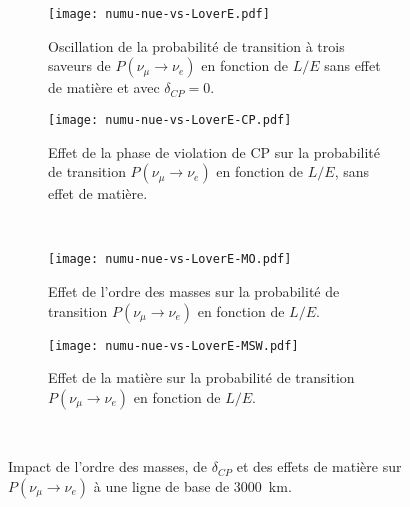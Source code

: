       \begin{figure}[!htb]
        \centering
        \begin{subfigure}[t]{0.49\textwidth}
          \centering
          \texttt{[image: numu-nue-vs-LoverE.pdf]}
          \caption{\label{fig::3flav_oscillation_vanilla}Oscillation de la probabilité de transition à trois saveurs de $P(\nu_{\mu}\to\nu_e)$ en fonction de $L/E$ sans effet de matière et avec $\delta_{CP}=0$.}
        \end{subfigure}\hfill
        \begin{subfigure}[t]{0.49\textwidth}
          \centering
          \texttt{[image: numu-nue-vs-LoverE-CP.pdf]}
          \caption{\label{fig::3flav_oscillation_cp}Effet de la phase de violation de CP sur la probabilité de transition $P(\nu_{\mu}\to\nu_e)$ en fonction de $L/E$, sans effet de matière.}
        \end{subfigure}\\
        \begin{subfigure}[t]{0.49\textwidth}
          \centering
          \texttt{[image: numu-nue-vs-LoverE-MO.pdf]}
          \caption{\label{fig::3flav_oscillation_ordering}Effet de l'ordre des masses sur la probabilité de transition $P(\nu_{\mu}\to\nu_e)$ en fonction de $L/E$.}
        \end{subfigure}\hfill
        \begin{subfigure}[t]{0.49\textwidth}
          \centering
          \texttt{[image: numu-nue-vs-LoverE-MSW.pdf]}
          \caption{\label{fig::3flav_oscillation_matter}Effet de la matière sur la probabilité de transition $P(\nu_{\mu}\to\nu_e)$ en fonction de $L/E$.}
        \end{subfigure}\\
        \caption[Impact de l'ordre des masses, de $\delta_{CP}$ et des effets de matière sur $P(\nu_{\mu}\to\nu_e)$]{\label{fig::3flav_oscillation}Impact de l'ordre des masses, de $\delta_{CP}$ et des effets de matière sur $P(\nu_{\mu}\to\nu_e)$ à une ligne de base de \SI{3000}{\kilo\meter}.}
      \end{figure}

